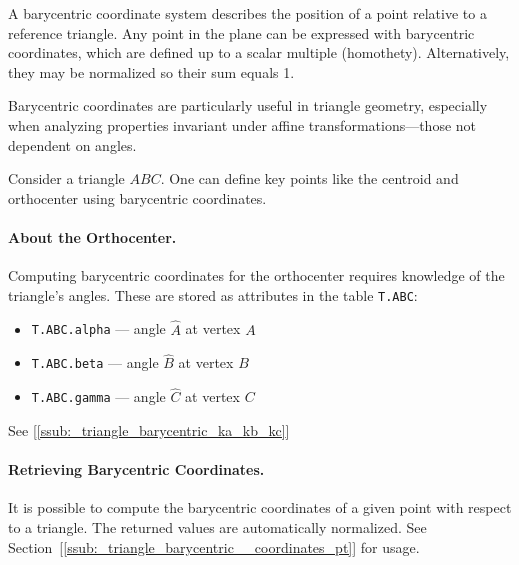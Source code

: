A barycentric coordinate system describes the position of a point relative to a reference triangle. Any point in the plane can be expressed with barycentric coordinates, which are defined up to a scalar multiple (homothety). Alternatively, they may be normalized so their sum equals 1.

Barycentric coordinates are particularly useful in triangle geometry, especially when analyzing properties invariant under affine transformations—those not dependent on angles.

Consider a triangle $ABC$. One can define key points like the centroid and orthocenter using barycentric coordinates.

\paragraph{About the Orthocenter.}
Computing barycentric coordinates for the orthocenter requires knowledge of the triangle's angles. These are stored as attributes in the table \texttt{T.ABC}:
\begin{itemize}
  \item \texttt{T.ABC.alpha} — angle $\widehat{A}$ at vertex $A$
  \item \texttt{T.ABC.beta}  — angle $\widehat{B}$ at vertex $B$
  \item \texttt{T.ABC.gamma} — angle $\widehat{C}$ at vertex $C$
\end{itemize}

See  [\ref{ssub:_triangle_barycentric_ka_kb_kc}]

\paragraph{Retrieving Barycentric Coordinates.}
It is possible to compute the barycentric coordinates of a given point with respect to a triangle. The returned values are automatically normalized. See Section~[\ref{ssub:_triangle_barycentric__coordinates_pt}] for usage.


\begin{minipage}{.5\textwidth}
\end{minipage}
\begin{minipage}{.5\textwidth}
\begin{tkzexample}
\end{tkzexample}
\end{minipage}


